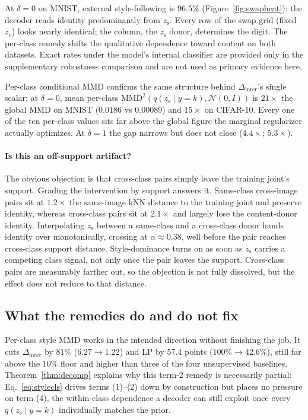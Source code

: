 \documentclass[letterpaper]{article} %
\newcommand{\zc}{z_{\mathrm{c}}}
\newcommand{\zs}{z_{\mathrm{s}}}
\newcommand{\MMD}{\mathrm{MMD}}
\newcommand{\Dinter}{\Delta_{\mathrm{inter}}}
\begin{document}
At $\delta{=}0$ on MNIST, external style-following is $96.5\%$
(Figure~\ref{fig:swapheat}): the decoder reads identity predominantly from
$\zs$. Every row of the swap grid (fixed $\zc$) looks nearly identical; the
column, the $\zs$ donor, determines the digit. The per-class remedy shifts
the qualitative dependence toward content on both datasets. Exact rates
under the model's internal classifier are provided only in the supplementary
robustness comparison and are not used as primary evidence here.

Per-class conditional MMD confirms the same structure behind $\Dinter$'s
single scalar: at $\delta{=}0$, mean per-class $\MMD^2(q(\zs\mid
y{=}k),\mathcal N(0,I))$ is $21\times$ the global MMD on MNIST ($0.0186$ vs
$0.00089$) and $15\times$ on CIFAR-10. Every one of the ten per-class values
sits far above the global figure the marginal regularizer actually optimizes.
At $\delta{=}1$ the gap narrows but does not close ($4.4\times$; $5.3\times$).

\paragraph{Is this an off-support artifact?}
The obvious objection is that cross-class pairs simply leave the training
joint's support. Grading the intervention by support answers it. Same-class
cross-image pairs sit at $1.2\times$ the same-image kNN distance to the
training joint and preserve identity, whereas cross-class pairs sit at
$2.1\times$ and largely lose the content-donor identity. Interpolating
$\zs$ between a same-class and a cross-class donor hands identity over
monotonically, crossing at $\alpha\approx0.38$, well before the pair reaches
cross-class support distance. Style-dominance turns on as soon as $\zs$
carries a competing class signal, not only once the pair leaves the support.
Cross-class pairs are measurably farther out, so the objection is not fully
dissolved, but the effect does not reduce to that distance.

\subsection{What the remedies do and do not fix}
\label{sec:exp-remedy}

Per-class style MMD works in the intended direction without finishing the
job. It cuts $\Dinter$ by $81\%$ ($6.27\to1.22$) and LP by $57.4$ points
($100\%\to42.6\%$), still far above the $10\%$ floor and higher than three of
the four unsupervised baselines. Theorem~\ref{thm:decomp} explains why this
term-2 remedy is necessarily partial: Eq.~\ref{eq:stylecls} drives terms
(1)--(2) down by construction but places no pressure on term (4), the
within-class dependence a decoder can still exploit once every
$q(\zs\mid y{=}k)$ individually matches the prior.
\end{document}
